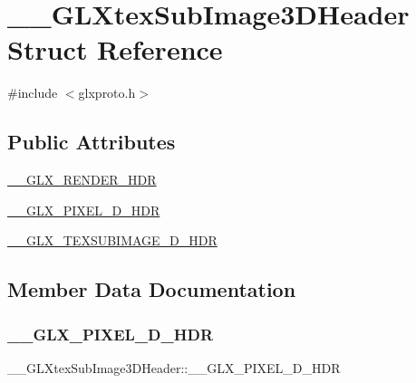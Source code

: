 \hypertarget{struct_____g_l_xtex_sub_image3_d_header}{}\section{\+\_\+\+\_\+\+G\+L\+Xtex\+Sub\+Image3\+D\+Header Struct Reference}
\label{struct_____g_l_xtex_sub_image3_d_header}


{\ttfamily \#include $<$glxproto.\+h$>$}

\subsection*{Public Attributes}
\begin{DoxyCompactItemize}
\item 
\hyperlink{struct_____g_l_xtex_sub_image3_d_header_a8330c6b07aa7178666fabe9adfe3b71c}{\+\_\+\+\_\+\+G\+L\+X\+\_\+\+R\+E\+N\+D\+E\+R\+\_\+\+H\+DR}
\item 
\hyperlink{struct_____g_l_xtex_sub_image3_d_header_a13ce120b1ebd037f10ad3765fdff8619}{\+\_\+\+\_\+\+G\+L\+X\+\_\+\+P\+I\+X\+E\+L\+\_\+D\+\_\+\+H\+DR}
\item 
\hyperlink{struct_____g_l_xtex_sub_image3_d_header_af88cb44b949694cbf821b5598795fb67}{\+\_\+\+\_\+\+G\+L\+X\+\_\+\+T\+E\+X\+S\+U\+B\+I\+M\+A\+G\+E\+\_\+D\+\_\+\+H\+DR}
\end{DoxyCompactItemize}


\subsection{Member Data Documentation}
\mbox{\label{struct_____g_l_xtex_sub_image3_d_header_a13ce120b1ebd037f10ad3765fdff8619}} 
\subsubsection{\texorpdfstring{\+\_\+\+\_\+\+G\+L\+X\+\_\+\+P\+I\+X\+E\+L\+\_\+D\+\_\+\+H\+DR}{\_\_GLX\_PIXEL\_3D\_HDR}}
{\footnotesize\ttfamily \+\_\+\+\_\+\+G\+L\+Xtex\+Sub\+Image3\+D\+Header\+::\+\_\+\+\_\+\+G\+L\+X\+\_\+\+P\+I\+X\+E\+L\+\_\+D\+\_\+\+H\+DR}


